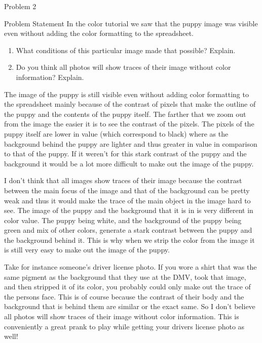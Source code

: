 \begin{problem}{Problem 2}
    \begin{statement}{Problem Statement}
        In the color tutorial we saw that the puppy image was visible even without adding the color formatting to the spreadsheet.

        \begin{enumerate}[label = (\alph*)]
            \item What conditions of this particular image made that possible? Explain.
            \item Do you think all photos will show traces of their image without color information? Explain.
        \end{enumerate}
    \end{statement}

    \begin{Highlight}
        The image of the puppy is still visible even without adding color formatting to the spreadsheet mainly because of the contrast of pixels that make the outline of the puppy and the contents of 
        the puppy itself. The farther that we zoom out from the image the easier it is to see the contrast of the pixels. The pixels of the puppy itself are lower in value (which correspond to black)
        where as the background behind the puppy are lighter and thus greater in value in comparison to that of the puppy. If it weren't for this stark contrast of the puppy and the background it would
        be a lot more difficult to make out the image of the puppy.
    \end{Highlight}

    \begin{Highlight}
        I don't think that all images show traces of their image because the contrast between the main focus of the image and that of the background can be pretty weak and thus it would make the trace
        of the main object in the image hard to see. The image of the puppy and the background that it is in is very different in color value. The puppy being white, and the background of the puppy being
        green and mix of other colors, generate a stark contrast between the puppy and the background behind it. This is why when we strip the color from the image it is still very easy to make out the
        image of the puppy.

        Take for instance someone's driver license photo. If you wore a shirt that was the same pigment as the background that they use at the DMV, took that image, and then stripped it of its color,
        you probably could only make out the trace of the persons face. This is of course because the contrast of their body and the background that is behind them are similar or the exact same. So I
        don't believe all photos will show traces of their image without color information. This is conveniently a great prank to play while getting your drivers license photo as well!
    \end{Highlight}
\end{problem}

